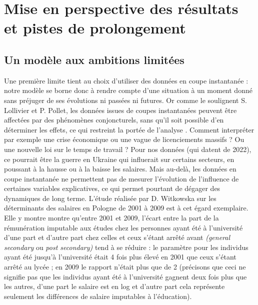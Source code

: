 \documentclass[a4paper, french, 11 pt]{article}\usepackage[]{graphicx}\usepackage[]{xcolor}
\begin{document}
\section{Mise en perspective des résultats et pistes de prolongement}

\subsection{Un modèle aux ambitions limitées}

Une première limite tient au choix d’utiliser des données en coupe instantanée : notre modèle se borne donc à rendre compte d'une situation à un moment donné sans préjuger de ses évolutions ni passées ni futures. Or comme le soulignent S. Lollivier et P. Pollet, les données issues de coupes instantanées peuvent être affectées par des phénomènes conjoncturels, sans qu'il soit possible d'en déterminer les effets, ce qui restreint la portée de l'analyse \parencite{lollivier2003}. Comment interpréter par exemple une crise économique ou une vague de licenciements massifs ? Ou une nouvelle loi sur le temps de travail ? Pour nos données (qui datent de 2022), ce pourrait être la guerre en Ukraine qui influerait sur certains secteurs, en poussant à la hausse ou à la baisse les salaires. Mais au-delà, les données en coupe instantanée ne permettent pas de mesurer l'évolution de l'influence de certaines variables explicatives, ce qui permet pourtant de dégager des dynamiques de long terme.   L'étude réalisée par D. Witkowska sur les déterminants des salaires en Pologne de 2001 à 2009 est à cet égard exemplaire. Elle y montre montre qu'entre 2001 et 2009, l'écart entre la part de la rémunération imputable aux études chez les personnes ayant été à l'université d'une part et d'autre part chez celles et ceux s’étant arrêté avant \textit{(general secondary} ou \textit{post secondary)} tend à se réduire : le paramètre pour les individus ayant été jusqu’à l’université était 4 fois plus élevé en 2001 que ceux s’étant arrêté au lycée ; en 2009 le rapport n’était plus que de 2 \parencite[p. 206]{witkowska2014} (précisons que ceci ne signifie pas que les individus ayant été à l’université gagnent deux fois plus que les autres, d’une part le salaire est en log et d’autre part cela représente seulement les différences de salaire imputables à l’éducation).
\end{document}
